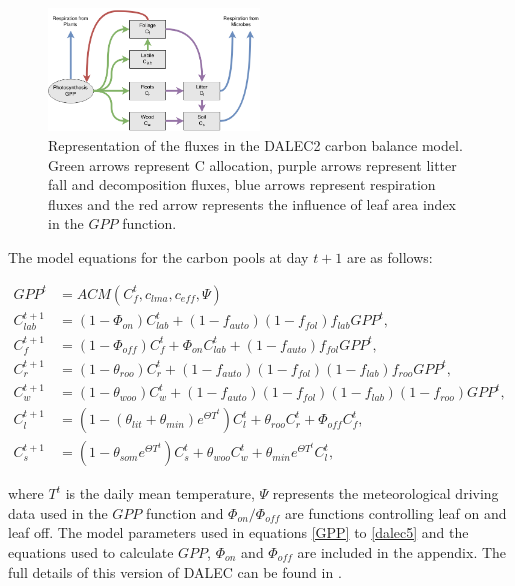 \documentclass[11pt]{article}
\begin{document}
\begin{figure}[ht]
    \centering
    \includegraphics[width=0.5\textwidth]{Dalecdiagram.png}
    \caption{Representation of the fluxes in the DALEC2 carbon balance model. Green arrows represent C allocation, purple arrows represent litter fall and decomposition fluxes, blue arrows represent respiration fluxes and the red arrow represents the influence of leaf area index in the $GPP$ function.}
    \label{fig:DALEC_mod}
\end{figure}

The model equations for the carbon pools at day $t+1$ are as follows:

\begin{align}
GPP^{t} &= ACM(C_f^{t}, c_{lma}, c_{eff}, \Psi) \label{GPP}
\\C_{lab}^{t+1}&=(1-\Phi _{on})C_{lab}^{t}+(1-f_{auto})(1-f_{fol})f_{lab}GPP^{t}, \label{daleclab}
\\C_f^{t+1}&=(1-\Phi_{off})C_f^{t}+\Phi_{on}C_{lab}^{t}+(1-f_{auto})f_{fol}GPP^{t}, \label{dalec1}
\\C_r^{t+1}&=(1-\theta_{roo})C_r^{t}+(1-f_{auto})(1-f_{fol})(1-f_{lab})f_{roo}GPP^{t}, 
\\C_w^{t+1}&=(1-\theta_{woo})C_w^{t}+(1-f_{auto})(1-f_{fol})(1-f_{lab})(1-f_{roo})GPP^{t}, 
\\C_l^{t+1}&=(1-(\theta_{lit}+\theta_{min})e^{\Theta T^{t}})C_l^{t}+\theta_{roo}C_r^{t}+\Phi_{off}C_f^{t}, 
\\C_s^{t+1}&=(1-\theta_{som}e^{\Theta T^{t}})C_s^{t}+\theta_{woo}C_w^{t}+\theta_{min}e^{\Theta T^{t}}C_l^{t}, \label{dalec5}
\end{align}

where $T^{t}$ is the daily mean temperature, $\Psi$ represents the meteorological driving data used in the $GPP$ function and $\Phi_{on} / \Phi_{off}$ are functions controlling leaf on and leaf off. The model parameters used in equations \ref{GPP} to \ref{dalec5} and the equations used to calculate $GPP$, $\Phi_{on}$ and $\Phi_{off}$ are included in the appendix. The full details of this version of DALEC can be found in \cite{Bloom2015}.
\end{document}
